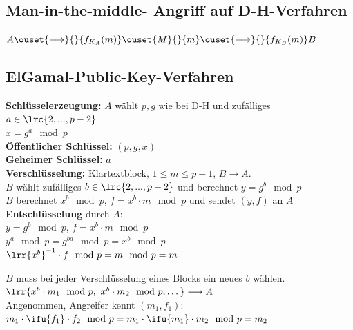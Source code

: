 	\subsection{Man-in-the-middle- Angriff auf D-H-Verfahren}

		$A\ouset{\longrightarrow}{}{f_{K_A}(m)}\ouset{M}{}{m}
  \ouset{\longrightarrow}{}{f_{K_B}(m)} B$

	\subsection{ElGamal-Public-Key-Verfahren}
		\textbf{Schlüsselerzeugung:} $A$ wählt $p,g$ wie bei D-H und zufälliges $a\in\lrc{2,...,p-2}$\\
		$x=g^a\mod p$\\
		\textbf{Öffentlicher Schlüssel:} $(p,g,x)$\\
		\textbf{Geheimer Schlüssel:} $a$\\
		\textbf{Verschlüsselung:} Klartextblock, $1\leq m\leq p-1$, $B\rightarrow A$.\\
		$B$ wählt zufälliges $b\in\lrc{2,...,p-2}$ und berechnet $y=g^b\mod p$\\
		$B$ berechnet $x^b\mod p$, $f=x^b\cdot m\mod p$ und sendet $(y,f)$ an $A$\\
		\textbf{Entschlüsselung} durch $A$:\\
		$y=g^b\mod p$, $f=x^b\cdot m\mod p$\\
		$y^a\mod p=g^{ba}\mod p=x^b\mod p$\\
		$\lrr{x^b}^{-1}\cdot f\mod p=m\mod p=m$
		
		$B$ muss bei jeder Verschlüsselung eines Blocks ein neues $b$ wählen.\\
		$\lrr{x^b\cdot m_1\mod p,\ x^b\cdot m_2\mod p, \dots}\longrightarrow A$\\
		Angenommen, Angreifer kennt $(m_1,f_1)$:\\
		$m_1\cdot\ifu{f_1}\cdot f_2\mod p=m_1\cdot\ifu{m_1}\cdot m_2\mod p=m_2$
\newpage
